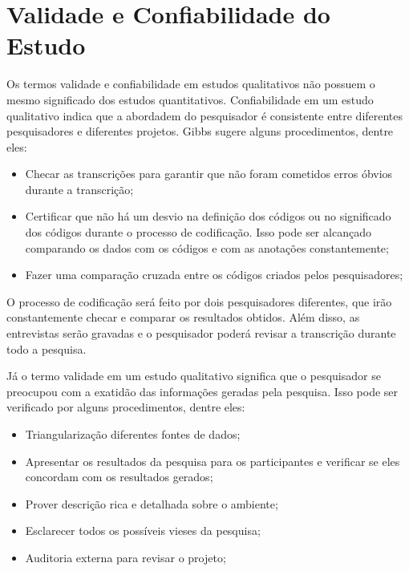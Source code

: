 \section{Validade e Confiabilidade do Estudo}
\label{sec:planejamento-validacao}

Os termos validade e confiabilidade em estudos qualitativos não possuem o mesmo 
significado dos estudos quantitativos. Confiabilidade em um estudo qualitativo 
indica que a abordadem do pesquisador é consistente entre diferentes
pesquisadores e diferentes projetos. Gibbs \cite{gibbs} sugere alguns
procedimentos,  dentre eles:

\begin{itemize}
	\item Checar as transcrições para garantir que não foram cometidos erros 
	óbvios durante a transcrição;

	\item Certificar que não há um desvio na definição dos códigos ou no
	significado dos  códigos durante o processo de codificação. Isso pode ser
	alcançado comparando os dados com os códigos e com as anotações constantemente;

	\item Fazer uma comparação cruzada entre os códigos criados pelos
	pesquisadores;
\end{itemize}

O processo de codificação será feito por dois pesquisadores diferentes, que 
irão constantemente checar e comparar os resultados obtidos. Além disso, as 
entrevistas serão gravadas e o pesquisador poderá revisar a transcrição  durante
todo a pesquisa.

Já o termo validade em um estudo qualitativo significa que o pesquisador  se
preocupou com a exatidão das informações geradas pela pesquisa. Isso pode ser 
verificado por alguns procedimentos, dentre eles:

\begin{itemize}
	\item Triangularização diferentes fontes de dados;

	\item Apresentar os resultados da pesquisa para os participantes  e verificar
	se eles concordam com os resultados gerados;

	\item Prover descrição rica e detalhada sobre o ambiente;

	\item Esclarecer todos os possíveis vieses da pesquisa;

	\item Auditoria externa para revisar o projeto;
\end{itemize}


